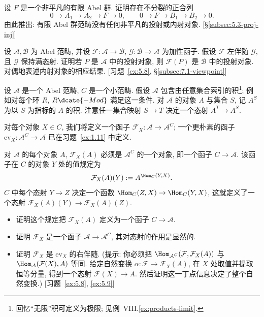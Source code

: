 \begin{prob}\label{ex:5.5}
设 $F$ 是一个非平凡的有限 Abel 群. 证明存在不分裂的正合列
\[
0\longrightarrow A_1\longrightarrow A_2\longrightarrow F\longrightarrow 0,\qquad
0\longrightarrow F\longrightarrow B_1\longrightarrow B_2\longrightarrow 0.
\]
由此推出: 有限 Abel 群范畴没有任何非平凡的投射或内射对象. [\S\ref{subsec:5.3-proj-inj}]
\end{prob}

\begin{prob}\label{ex:5.6}
设 $\mathcal{A},\mathcal{B}$ 为 Abel 范畴, 并设 $\mathcal{F}:\mathcal{A}\to\mathcal{B}$, $\mathcal{G}:\mathcal{B}\to\mathcal{A}$ 为加性函子. 假设 $\mathcal{F}$ 左伴随 $\mathcal{G}$, 且 $\mathcal{G}$ 保持满态射. 证明若 $P$ 是 $\mathcal{A}$ 中的投射对象, 则 $\mathcal{F}(P)$ 是 $\mathcal{B}$ 中的投射对象. 对偶地表述内射对象的相应结果. [习题~\ref{ex:5.8}, \S\ref{subsec:7.1-viewpoint}]
\end{prob}

\begin{prob}\label{ex:5.7}
设 $\mathcal{A}$ 是一个 Abel 范畴, $C$ 是一个小范畴. 假设 $\mathcal{A}$ 包含由任意集合索引的积\footnote{回忆``无限''积可定义为极限; 见例~VIII.\ref{ex:products-limit}.}; 例如对每个环 $R$, $R\dcate{-Mod}$ 满足这一条件. 对 $\mathcal{A}$ 的对象 $A$ 与集合 $S$, 记 $A^S$ 为以 $S$ 为指标的 $A$ 的积. 注意任一集合映射 $S\to T$ 决定一个态射 $A^T\to A^S$.

对每个对象 $X\in C$, 我们将定义一个函子 $\mathcal{F}_X:\mathcal{A}\to\mathcal{A}^C$; 一个更朴素的函子 $\mathrm{ev}_X:\mathcal{A}^C\to\mathcal{A}$ 已在习题~\ref{ex:1.11} 中定义.

对 $\mathcal{A}$ 的每个对象 $A$, $\mathcal{F}_X(A)$ 必须是 $\mathcal{A}^C$ 的一个对象, 即一个函子 $C\to\mathcal{A}$. 该函子在 $C$ 的对象 $Y$ 处的值规定为
\[
\mathcal{F}_X(A)(Y):=A^{\Hom_C(Y,X)}.
\]
$C$ 中每个态射 $Y\to Z$ 决定一个函数 $\Hom_C(Z,X)\to\Hom_C(Y,X)$, 这就定义了一个态射 $\mathcal{F}_X(A)(Y)\to\mathcal{F}_X(A)(Z)$.
\begin{itemize}
\item 证明这个规定把 $\mathcal{F}_X(A)$ 定义为一个函子 $C\to\mathcal{A}$.
\item 证明 $\mathcal{F}_X$ 是一个函子 $\mathcal{A}\to\mathcal{A}^C$, 其对态射的作用是显然的.
\item 证明 $\mathcal{F}_X$ 是 $\mathrm{ev}_X$ 的右伴随. (提示: 你必须把 $\Hom_{\mathcal{A}^C}(\mathcal{F},\mathcal{F}_X(A))$ 与 $\Hom_{\mathcal{A}}(\mathcal{F}(X),A)$ 等同. 给定自然变换 $\alpha:\mathcal{F}\to\mathcal{F}_X(A)$, 在 $X$ 处取值并提取恒等分量, 得到一个态射 $\mathcal{F}(X)\to A$. 然后证明这一丁点信息决定了整个自然变换.) [习题~\ref{ex:5.8}, \ref{ex:5.9}]
\end{itemize}
\end{prob}

